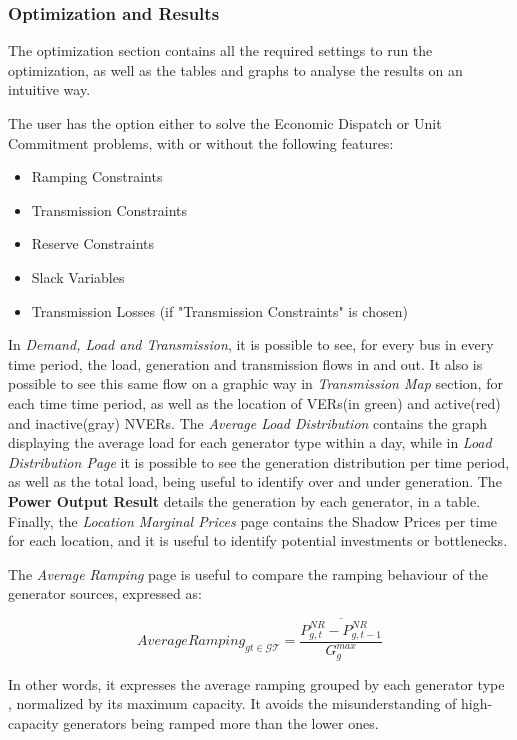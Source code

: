 \documentclass[12pt,LUDisStyle,twosided]{book}
\newcommand{\mc}{\mathcal}
\begin{document}
\subsubsection{Optimization and Results}

The optimization section contains all the required settings to run the optimization, as well as the tables and graphs to analyse the results on an intuitive way. 

The user has the option either to solve the Economic Dispatch or Unit Commitment problems, with or without the following features:

\begin{itemize}
\item Ramping Constraints
\item Transmission Constraints
\item Reserve Constraints
\item Slack Variables
\item Transmission Losses (if "Transmission Constraints" is chosen)
\end{itemize}

In \textit{Demand, Load and Transmission}, it is possible to see, for every bus in every time period, the load, generation and transmission flows in and out. It also is possible to see this same flow on a graphic way in \textit{Transmission Map} section, for each time time period, as well as the location of VERs(in green) and active(red) and inactive(gray) NVERs. The \textit{Average Load Distribution} contains the graph displaying the average load for each generator type within a day, while in \textit{Load Distribution Page} it is possible to see the generation distribution per time period, as well as the total load, being useful to identify over and under generation. The \textbf{Power Output Result} details the generation by each generator, in a table. Finally, the \textit{Location Marginal Prices} page contains the Shadow Prices per time for each location, and it is useful to identify potential investments or bottlenecks.

The \textit{Average Ramping} page is useful to compare the ramping behaviour of the generator sources, expressed as:

\begin{equation}
    AverageRamping_{gt \in \mc{GT}} = \overline{\dfrac{P^{NR}_{g,t} - P^{NR}_{g,t-1}}{G^{max}_{g}}}
\end{equation}

In other words, it expresses the average ramping grouped by each generator type , normalized by its maximum capacity. It avoids the misunderstanding of high-capacity generators being ramped more than the lower ones.
\end{document}
